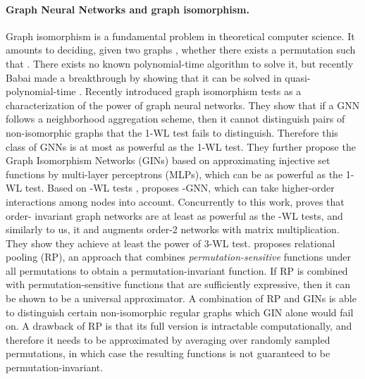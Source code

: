 \documentclass{article}
\begin{document}
\paragraph{Graph Neural Networks and graph isomorphism.} Graph isomorphism is a fundamental problem in theoretical computer science. It amounts to deciding, given two graphs , whether there exists a permutation  such that . There exists no known polynomial-time algorithm to solve it, but recently Babai made a breakthrough by showing that it can be solved in quasi-polynomial-time \cite{babai2016graph}. Recently  
\cite{xu2018powerful} introduced graph isomorphism tests as a characterization of the power of graph neural networks. They show that if a GNN follows a neighborhood aggregation scheme, then it cannot distinguish pairs of non-isomorphic graphs that the 1-WL test fails to distinguish. Therefore this class of GNNs is at most as powerful as the 1-WL test. They further propose the Graph Isomorphism Networks (GINs) based on approximating injective set functions by multi-layer perceptrons (MLPs), which can be as powerful as the 1-WL test. Based on -WL tests \cite{cai1992optimal}, \cite{morris2019higher} proposes -GNN, which can take higher-order interactions among nodes into account. Concurrently to this work, \cite{maron2019provably} proves that order- invariant graph networks are at least as powerful as the -WL tests, and similarly to us, it and augments order-2 networks with matrix multiplication. They show they achieve at least the power of 3-WL test. \cite{murphy2019relational} proposes relational pooling (RP), an approach that combines \textit{permutation-sensitive} functions under all permutations to obtain a permutation-invariant function. If RP is combined with permutation-sensitive functions that are sufficiently expressive, then it can be shown to be a universal approximator. A combination of RP and GINs is able to distinguish certain non-isomorphic regular graphs which GIN alone would fail on. A drawback of RP is that its full version is intractable computationally, and therefore it needs to be approximated by averaging over randomly sampled permutations, in which case the resulting functions is not guaranteed to be permutation-invariant. 
\end{document}
